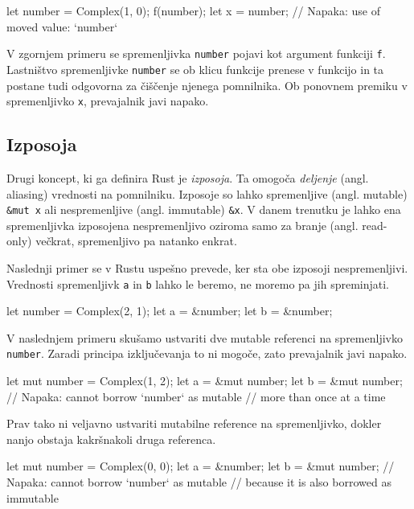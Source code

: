\begin{rust-failure}
let number = Complex(1, 0);
f(number);
let x = number;  // Napaka: use of moved value: `number`
\end{rust-failure}

V zgornjem primeru se spremenljivka \texttt{number} pojavi kot argument funkciji \texttt{f}. Lastništvo spremenljivke \texttt{number} se ob klicu funkcije prenese v funkcijo in ta postane tudi odgovorna za čiščenje njenega pomnilnika. Ob ponovnem premiku v spremenljivko \texttt{x}, prevajalnik javi napako.

\subsection{Izposoja}

Drugi koncept, ki ga definira Rust je \textit{izposoja}. Ta omogoča \textit{deljenje} (angl. aliasing) vrednosti na pomnilniku. Izposoje so lahko spremenljive (angl. mutable) \texttt{\&mut x} ali nespremenljive (angl. immutable) \texttt{\&x}. V danem trenutku je lahko ena spremenljivka izposojena nespremenljivo oziroma samo za branje (angl. read-only) večkrat, spremenljivo pa natanko enkrat.

Naslednji primer se v Rustu uspešno prevede, ker sta obe izposoji nespremenljivi. Vrednosti spremenljivk \texttt{a} in \texttt{b} lahko le beremo, ne moremo pa jih spreminjati.

\begin{rust-success}
let number = Complex(2, 1);
let a = &number;
let b = &number;
\end{rust-success}

V naslednjem primeru skušamo ustvariti dve mutable referenci na spremenljivko \texttt{number}. Zaradi principa izključevanja to ni mogoče, zato prevajalnik javi napako.

\begin{rust-failure}
let mut number = Complex(1, 2);
let a = &mut number;
let b = &mut number;  // Napaka: cannot borrow `number` as mutable
                      // more than once at a time
\end{rust-failure}

Prav tako ni veljavno ustvariti mutabilne reference na spremenljivko, dokler nanjo obstaja kakršnakoli druga referenca.

\begin{rust-failure}
let mut number = Complex(0, 0);
let a = &number;
let b = &mut number;  // Napaka: cannot borrow `number` as mutable
                      // because it is also borrowed as immutable
\end{rust-failure}

